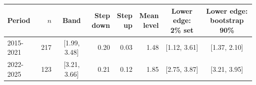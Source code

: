 \begin{tabular}{lrcrrrcc}\toprule
Period & $n$ & Band & \hd{Step\\down} & \hd{Step\\up} & \hd{Mean\\level} & \hd{Lower edge:\\2\% set} & \hd{Lower edge:\\bootstrap 90\%}\\\midrule
2015-2021 & 217 & [1.99, 3.48] & 0.20 & 0.03 & 1.48 & [1.12, 3.61] & [1.37, 2.10]\\
2022-2025 & 123 & [3.21, 3.66] & 0.21 & 0.12 & 1.85 & [2.75, 3.87] & [3.21, 3.95]\\
\bottomrule\end{tabular}
